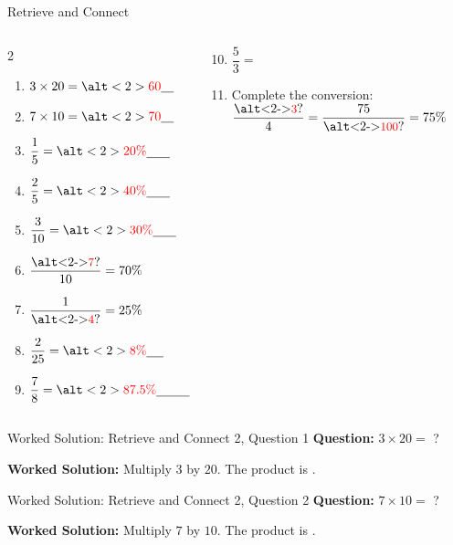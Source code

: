 \documentclass{beamer}
\newcommand{\ablank}[1]{%
  \alt<2>{\textcolor{red}{#1}}{\underline{\phantom{#1}}}%
}
\newcommand{\ashowq}[1]{\alt<2->{\textcolor{red}{\small #1}}{?}}
\begin{document}
\begin{frame}[t]{Retrieve and Connect}
\begin{columns}
\vspace{-2em}
\begin{multicols}{2}
\begin{enumerate}
   \setlength{\itemsep}{12pt}
  \item $3 \times 20 = \ablank{60}$
  \item $7 \times 10 = \ablank{70}$
  \item $\dfrac{1}{5} = \ablank{20\%}$
  \item $\dfrac{2}{5} = \ablank{40\%}$
  \item $\dfrac{3}{10} = \ablank{30\%}$
  \item $\dfrac{\text{\ashowq{7}}}{10} = 70\%$
  \item $\dfrac{1}{\text{\ashowq{4}}} = 25\%$
  \item $\dfrac{2}{25} = \ablank{8\%}$
  \item $\dfrac{7}{8} = \ablank{87.5\%}$
  \end{enumerate}
\end{multicols}
\begin{center}
  \begin{enumerate}
  \setcounter{enumi}{9}
  \item $\dfrac{5}{3}={}$\ablank{$166.\dot{6}\%$}
  \vspace{0.6em}
  \item Complete the conversion: \\[2pt]
        $\dfrac{\text{\ashowq{3}}}{4} = \dfrac{75}{\text{\ashowq{100}}} = 75\%$
\end{enumerate}
\end{center}


\end{columns}
\end{frame}

\begin{frame}[t]{Worked Solution: Retrieve and Connect 2, Question 1}
\hypertarget{work-st2}{}
\textbf{Question:} \(3 \times 20 =\) ?

\smallskip
\textbf{Worked Solution:} Multiply \(3\) by \(20\). The product is \ablank{$60$}.
\end{frame}

\begin{frame}[t]{Worked Solution: Retrieve and Connect 2, Question 2}
\textbf{Question:} \(7 \times 10 =\) ?

\smallskip
\textbf{Worked Solution:} Multiply \(7\) by \(10\). The product is \ablank{$70$}.
\end{frame}
\end{document}
